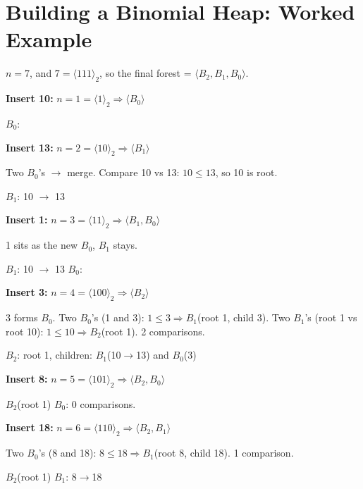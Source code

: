 \documentclass[11pt]{article}
\begin{document}
\section{Building a Binomial Heap: Worked Example}

\begin{examplebox}[Build a Min Binomial Heap from $S = \{10, 13, 1, 3, 8, 18, 7\}$]
$n = 7$, and $7 = \langle 111 \rangle_2$, so the final forest = $\langle B_2, B_1, B_0 \rangle$.

\textbf{Insert 10:} $n=1 = \langle 1 \rangle_2 \Rightarrow \langle B_0 \rangle$
\begin{center} $B_0$:  \end{center}

\textbf{Insert 13:} $n=2 = \langle 10 \rangle_2 \Rightarrow \langle B_1 \rangle$

Two $B_0$'s $\to$ merge. Compare 10 vs 13: $10 \le 13$, so 10 is root.
\begin{center} $B_1$: 10 $\to$ 13 \end{center}

\textbf{Insert 1:} $n=3 = \langle 11 \rangle_2 \Rightarrow \langle B_1, B_0 \rangle$

1 sits as the new $B_0$, $B_1$ stays.
\begin{center} $B_1$: 10 $\to$ 13 \qquad $B_0$:  \end{center}

\textbf{Insert 3:} $n=4 = \langle 100 \rangle_2 \Rightarrow \langle B_2 \rangle$

3 forms $B_0$. Two $B_0$'s (1 and 3): $1 \le 3 \Rightarrow B_1$(root 1, child 3). Two $B_1$'s (root 1 vs root 10): $1 \le 10 \Rightarrow B_2$(root 1). \quad \textcolor{rustW}{2 comparisons.}
\begin{center} $B_2$: root 1, children: $B_1$(10$\to$13) and $B_0$(3) \end{center}

\textbf{Insert 8:} $n=5 = \langle 101 \rangle_2 \Rightarrow \langle B_2, B_0 \rangle$
\begin{center} $B_2$(root 1) \qquad $B_0$:  \qquad \textcolor{greenO}{0 comparisons.} \end{center}

\textbf{Insert 18:} $n=6 = \langle 110 \rangle_2 \Rightarrow \langle B_2, B_1 \rangle$

Two $B_0$'s (8 and 18): $8 \le 18 \Rightarrow B_1$(root 8, child 18). \quad \textcolor{rustW}{1 comparison.}
\begin{center} $B_2$(root 1) \qquad $B_1$: 8$\to$18 \end{center}


\end{examplebox}
\end{document}
